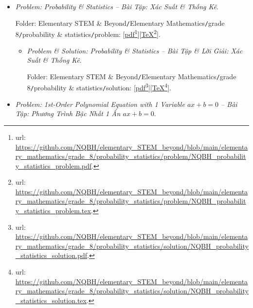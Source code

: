 \documentclass[12pt]{article}
\begin{document}
\begin{itemize}
\begin{itemize}
		Folder: {\sf Elementary STEM \& Beyond{\tt/}Elementary Mathematics{\tt/}grade 8{\tt/}triangle quadrilateral{\tt/}solution}: [\href{https://github.com/NQBH/elementary_STEM_beyond/blob/main/elementary_mathematics/grade_8/triangle_quadrilateral/solution/NQBH_triangle_quadrilateral_solution.pdf}{pdf}\footnote{{\sc url}: \url{https://github.com/NQBH/elementary_STEM_beyond/blob/main/elementary_mathematics/grade_8/triangle_quadrilateral/solution/NQBH_triangle_quadrilateral_solution.pdf}.}][\href{https://github.com/NQBH/elementary_STEM_beyond/blob/main/elementary_mathematics/grade_8/triangle_quadrilateral/solution/NQBH_triangle_quadrilateral_solution.tex}{\TeX}\footnote{{\sc url}: \url{https://github.com/NQBH/elementary_STEM_beyond/blob/main/elementary_mathematics/grade_8/triangle_quadrilateral/solution/NQBH_triangle_quadrilateral_solution.tex}.}].
	\end{itemize}
	\item {\it Problem: Probability \& Statistics -- Bài Tập: Xác Suất \& Thống Kê}.
	
	Folder: {\sf Elementary STEM \& Beyond{\tt/}Elementary Mathematics{\tt/}grade 8{\tt/}probability \& statistics{\tt/}problem}: [\href{https://github.com/NQBH/elementary_STEM_beyond/blob/main/elementary_mathematics/grade_8/probability_statistics/problem/NQBH_probability_statistics_problem.pdf}{pdf}\footnote{{\sc url}: \url{https://github.com/NQBH/elementary_STEM_beyond/blob/main/elementary_mathematics/grade_8/probability_statistics/problem/NQBH_probability_statistics_problem.pdf}.}][\href{https://github.com/NQBH/elementary_STEM_beyond/blob/main/elementary_mathematics/grade_8/probability_statistics/problem/NQBH_probability_statistics_problem.tex}{\TeX}\footnote{{\sc url}: \url{https://github.com/NQBH/elementary_STEM_beyond/blob/main/elementary_mathematics/grade_8/probability_statistics/problem/NQBH_probability_statistics_problem.tex}.}].
	\begin{itemize}
		\item {\it Problem \& Solution: Probability \& Statistics -- Bài Tập \& Lời Giải: Xác Suất \& Thống Kê}.
		
		Folder: {\sf Elementary STEM \& Beyond{\tt/}Elementary Mathematics{\tt/}grade 8{\tt/}probability \& statistics{\tt/}solution}: [\href{https://github.com/NQBH/elementary_STEM_beyond/blob/main/elementary_mathematics/grade_8/probability_statistics/solution/NQBH_probability_statistics_solution.pdf}{pdf}\footnote{{\sc url}: \url{https://github.com/NQBH/elementary_STEM_beyond/blob/main/elementary_mathematics/grade_8/probability_statistics/solution/NQBH_probability_statistics_solution.pdf}.}][\href{https://github.com/NQBH/elementary_STEM_beyond/blob/main/elementary_mathematics/grade_8/probability_statistics/solution/NQBH_probability_statistics_solution.tex}{\TeX}\footnote{{\sc url}: \url{https://github.com/NQBH/elementary_STEM_beyond/blob/main/elementary_mathematics/grade_8/probability_statistics/solution/NQBH_probability_statistics_solution.tex}.}].
	\end{itemize}
	\item {\it Problem: 1st-Order Polynomial Equation with 1 Variable $ax + b = 0$ -- Bài Tập: Phương Trình Bậc Nhất 1 Ẩn $ax + b = 0$}.
	

\end{itemize}
\end{document}
